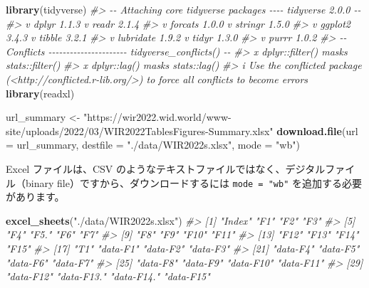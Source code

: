 \documentclass[
  xelatex, ja=standard]{bxjsbook}
\newenvironment{Shaded}{\begin{snugshade}}{\end{snugshade}}
\newcommand{\AttributeTok}[1]{\textcolor[rgb]{0.13,0.29,0.53}{#1}}
\newcommand{\CommentTok}[1]{\textcolor[rgb]{0.56,0.35,0.01}{\textit{#1}}}
\newcommand{\FunctionTok}[1]{\textcolor[rgb]{0.13,0.29,0.53}{\textbf{#1}}}
\newcommand{\NormalTok}[1]{#1}
\newcommand{\OtherTok}[1]{\textcolor[rgb]{0.56,0.35,0.01}{#1}}
\newcommand{\StringTok}[1]{\textcolor[rgb]{0.31,0.60,0.02}{#1}}
\theoremstyle{definition}
\theoremstyle{definition}
\theoremstyle{definition}
\theoremstyle{definition}
\theoremstyle{remark}
\begin{document}
\begin{Shaded}
\begin{Highlighting}[]
\FunctionTok{library}\NormalTok{(tidyverse)}
\CommentTok{\#\textgreater{} {-}{-} Attaching core tidyverse packages {-}{-}{-}{-} tidyverse 2.0.0 {-}{-}}
\CommentTok{\#\textgreater{} v dplyr     1.1.3     v readr     2.1.4}
\CommentTok{\#\textgreater{} v forcats   1.0.0     v stringr   1.5.0}
\CommentTok{\#\textgreater{} v ggplot2   3.4.3     v tibble    3.2.1}
\CommentTok{\#\textgreater{} v lubridate 1.9.2     v tidyr     1.3.0}
\CommentTok{\#\textgreater{} v purrr     1.0.2     }
\CommentTok{\#\textgreater{} {-}{-} Conflicts {-}{-}{-}{-}{-}{-}{-}{-}{-}{-}{-}{-}{-}{-}{-}{-}{-}{-}{-}{-}{-}{-} tidyverse\_conflicts() {-}{-}}
\CommentTok{\#\textgreater{} x dplyr::filter() masks stats::filter()}
\CommentTok{\#\textgreater{} x dplyr::lag()    masks stats::lag()}
\CommentTok{\#\textgreater{} i Use the conflicted package (\textless{}http://conflicted.r{-}lib.org/\textgreater{}) to force all conflicts to become errors}
\FunctionTok{library}\NormalTok{(readxl)}
\end{Highlighting}
\end{Shaded}

\begin{Shaded}
\begin{Highlighting}[]
\NormalTok{url\_summary }\OtherTok{\textless{}{-}} \StringTok{"https://wir2022.wid.world/www{-}site/uploads/2022/03/WIR2022TablesFigures{-}Summary.xlsx"}
\FunctionTok{download.file}\NormalTok{(}\AttributeTok{url =}\NormalTok{ url\_summary, }\AttributeTok{destfile =} \StringTok{"./data/WIR2022s.xlsx"}\NormalTok{, }\AttributeTok{mode =} \StringTok{"wb"}\NormalTok{) }
\end{Highlighting}
\end{Shaded}

Excel ファイルは、CSV のようなテキストファイルではなく、デジタルファイル（binary file）ですから、ダウンロードするには \texttt{mode\ =\ "wb"} を追加する必要があります。

\begin{Shaded}
\begin{Highlighting}[]
\FunctionTok{excel\_sheets}\NormalTok{(}\StringTok{"./data/WIR2022s.xlsx"}\NormalTok{)}
\CommentTok{\#\textgreater{}  [1] "Index"     "F1"        "F2"        "F3"       }
\CommentTok{\#\textgreater{}  [5] "F4"        "F5."       "F6"        "F7"       }
\CommentTok{\#\textgreater{}  [9] "F8"        "F9"        "F10"       "F11"      }
\CommentTok{\#\textgreater{} [13] "F12"       "F13"       "F14"       "F15"      }
\CommentTok{\#\textgreater{} [17] "T1"        "data{-}F1"   "data{-}F2"   "data{-}F3"  }
\CommentTok{\#\textgreater{} [21] "data{-}F4"   "data{-}F5"   "data{-}F6"   "data{-}F7"  }
\CommentTok{\#\textgreater{} [25] "data{-}F8"   "data{-}F9"   "data{-}F10"  "data{-}F11" }
\CommentTok{\#\textgreater{} [29] "data{-}F12"  "data{-}F13." "data{-}F14." "data{-}F15"}
\end{Highlighting}
\end{Shaded}
\end{document}
